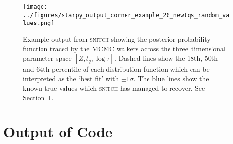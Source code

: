 \documentclass[useAMS,usenatbib]{mn2e}
\begin{document}
\begin{figure*}
\centering
\texttt{[image: ../figures/starpy\_output\_corner\_example\_20\_newtqs\_random\_values.png]}
\caption{Example output from \textsc{snitch} showing the posterior probability function traced by the MCMC walkers across the three dimensional parameter space $[Z, t_q, \log\tau]$. Dashed lines show the 18th, 50th and 64th percentile of each distribution function which can be interpreted as the `best fit' with $±1\sigma$. The blue lines show the known true values which \textsc{snitch} has managed to recover. See Section~\ref{sec:output}.}
\label{fig:output}
\end{figure*}

\section{Output of Code}\label{sec:output}


\end{document}
